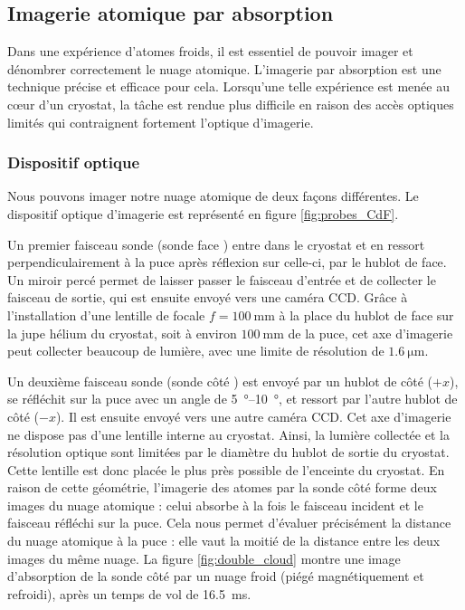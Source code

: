 \subsection{Imagerie atomique par absorption}
\noindent Dans une expérience d'atomes froids, il est essentiel de pouvoir imager et dénombrer correctement le nuage atomique.
L'imagerie par absorption est une technique précise et efficace pour cela.
Lorsqu'une telle expérience est menée au c\oe ur d'un cryostat, la tâche est rendue plus difficile en raison des accès optiques limités qui contraignent fortement l'optique d'imagerie.

\subsubsection*{Dispositif optique}
\noindent Nous pouvons imager notre nuage atomique de deux façons différentes.
Le dispositif optique d'imagerie est représenté en figure \eqref{fig:probes_CdF}.

Un premier faisceau sonde (\og sonde face \fg{})  entre dans le cryostat et en ressort perpendiculairement à la puce après réflexion sur celle-ci, par le hublot de face.
Un miroir percé permet de laisser passer le faisceau d'entrée et de collecter le faisceau de sortie, qui est ensuite envoyé vers une caméra CCD.
Grâce à l'installation d'une lentille de focale $f=\SI{100}{\mm}$ à la place du hublot de face sur la jupe hélium du cryostat, soit à environ $\SI{100}{\mm}$ de la puce, cet axe d'imagerie peut collecter beaucoup de lumière, avec une limite de résolution de $\SI{1.6}{\um}$.

Un deuxième faisceau sonde (\og sonde côté \fg{}) est envoyé par un hublot de côté ($+x$), se réfléchit sur la puce avec un angle de \SIrange{5}{10}{\degree}, et ressort par l'autre hublot de côté ($-x$). Il est ensuite envoyé vers une autre caméra CCD.
Cet axe d'imagerie ne dispose pas d'une lentille interne au cryostat. Ainsi, la lumière collectée et la résolution optique sont limitées par le diamètre du hublot de sortie du cryostat.
Cette lentille est donc placée le plus près possible de l'enceinte du cryostat.
En raison de cette géométrie, l'imagerie des atomes par la sonde côté forme deux images du nuage atomique : celui absorbe à la fois le faisceau incident et le faisceau réfléchi sur la puce.
Cela nous permet d'évaluer précisément la distance du nuage atomique à la puce : elle vaut la moitié de la distance entre les deux images du même nuage.
La figure \eqref{fig:double_cloud} montre une image d'absorption de la sonde côté par un nuage froid (piégé magnétiquement et refroidi), après un temps de vol de \SI{16.5}{\ms}.

